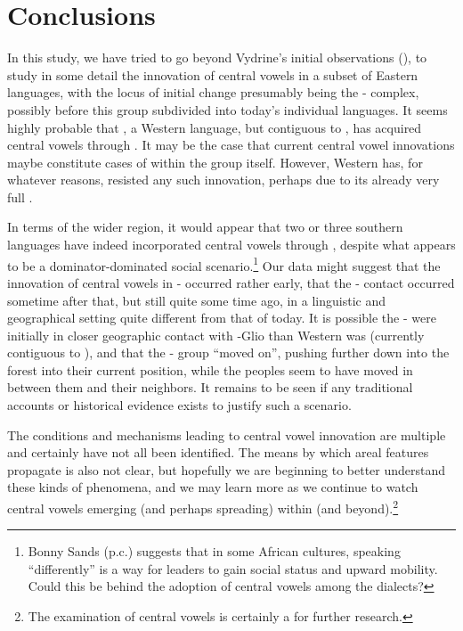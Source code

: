 \documentclass[output=paper,newtxmath,modfonts,nonflat]{langsci/langscibook}
\begin{document}
\section{Conclusions}\label{sec:zogbo:7} 

In this study, we have tried to go beyond Vydrine’s initial observations (\citeyear{Vydrine2009}), to study in some detail the innovation of central vowels in a subset of Eastern  languages, with the locus of initial change presumably being the -  complex, possibly before this group subdivided into today’s individual languages. It seems highly probable that , a Western  language, but contiguous to , has acquired central vowels through .  It may be the case that current central vowel innovations maybe constitute cases of  within the  group itself. However, Western  has, for whatever reasons, resisted any such innovation, perhaps due to its already very full .  

In terms of the wider region, it would appear that two or three southern  languages have indeed incorporated central vowels through , despite what appears to be a dominator-dominated social scenario.\footnote{Bonny Sands (p.c.) suggests that in some African cultures, speaking “differently” is a way for leaders to gain social status and upward mobility.  Could this be behind the adoption of  central vowels among the  dialects?} Our data might suggest that the innovation of central vowels in - occurred rather early, that the - contact occurred sometime after that, but still quite some time ago, in a linguistic and geographical setting quite different from that of today.  It is possible the -  were initially in closer geographic contact with -Glio than Western  was (currently contiguous to ), and that the -  group “moved on”, pushing further down into the forest into their current position, while the  peoples seem to have moved in between them and their  neighbors. It remains to be seen if any traditional accounts or historical evidence exists to justify such a scenario.  

The conditions and mechanisms leading to central vowel innovation are multiple and certainly have not all been identified.  The means by which areal features propagate is also not clear, but hopefully we are beginning to better understand these kinds of phenomena, and we may learn more as we continue to watch central vowels emerging (and perhaps spreading) within  (and beyond).\footnote{The examination of  central vowels is certainly a  for further research.} 
\end{document}
